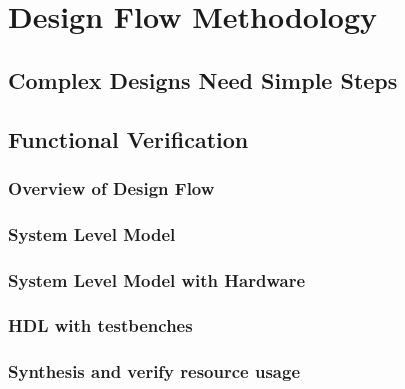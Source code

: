 \chapter{Design Flow Methodology}

\section{Complex Designs Need Simple Steps}

\section{Functional Verification}
\subsection{Overview of Design Flow}
\subsection{System Level Model}
\subsection{System Level Model with Hardware}
\subsection{HDL with testbenches}
\subsection{Synthesis and verify resource usage}
